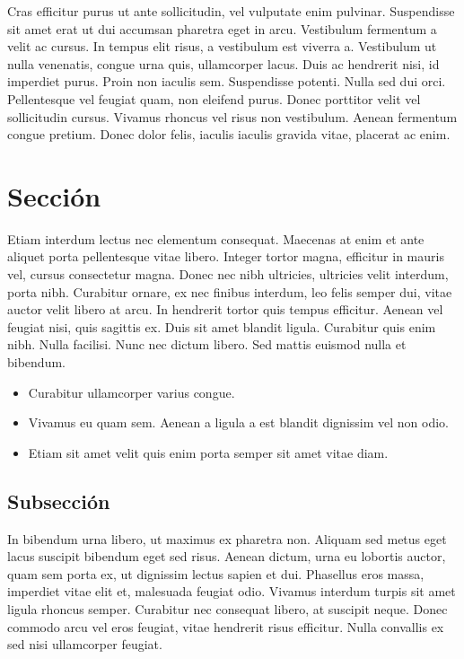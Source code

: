 Cras efficitur purus ut ante sollicitudin, vel vulputate enim pulvinar. Suspendisse sit amet erat ut dui accumsan pharetra eget in arcu. Vestibulum fermentum a velit ac cursus. In tempus elit risus, a vestibulum est viverra a. Vestibulum ut nulla venenatis, congue urna quis, ullamcorper lacus. Duis ac hendrerit nisi, id imperdiet purus. Proin non iaculis sem. Suspendisse potenti. Nulla sed dui orci. Pellentesque vel feugiat quam, non eleifend purus. Donec porttitor velit vel sollicitudin cursus. Vivamus rhoncus vel risus non vestibulum. Aenean fermentum congue pretium. Donec dolor felis, iaculis iaculis gravida vitae, placerat ac enim.

\section{Sección}
Etiam interdum lectus nec elementum consequat. Maecenas at enim et ante aliquet porta pellentesque vitae libero. Integer tortor magna, efficitur in mauris vel, cursus consectetur magna. Donec nec nibh ultricies, ultricies velit interdum, porta nibh. Curabitur ornare, ex nec finibus interdum, leo felis semper dui, vitae auctor velit libero at arcu. In hendrerit tortor quis tempus efficitur. Aenean vel feugiat nisi, quis sagittis ex. Duis sit amet blandit ligula. Curabitur quis enim nibh. Nulla facilisi. Nunc nec dictum libero. Sed mattis euismod nulla et bibendum.

\begin{itemize}
\renewcommand{\labelitemi}{$\bullet$}
\setlength{\itemindent}{5mm}
    \item Curabitur ullamcorper varius congue.
    \item Vivamus eu quam sem. Aenean a ligula a est blandit dignissim vel non odio.
    \item Etiam sit amet velit quis enim porta semper sit amet vitae diam.
\end{itemize}

\subsection{Subsección}
In bibendum urna libero, ut maximus ex pharetra non. Aliquam sed metus eget lacus suscipit bibendum eget sed risus. Aenean dictum, urna eu lobortis auctor, quam sem porta ex, ut dignissim lectus sapien et dui. Phasellus eros massa, imperdiet vitae elit et, malesuada feugiat odio. Vivamus interdum turpis sit amet ligula rhoncus semper. Curabitur nec consequat libero, at suscipit neque. Donec commodo arcu vel eros feugiat, vitae hendrerit risus efficitur. Nulla convallis ex sed nisi ullamcorper feugiat.\\

